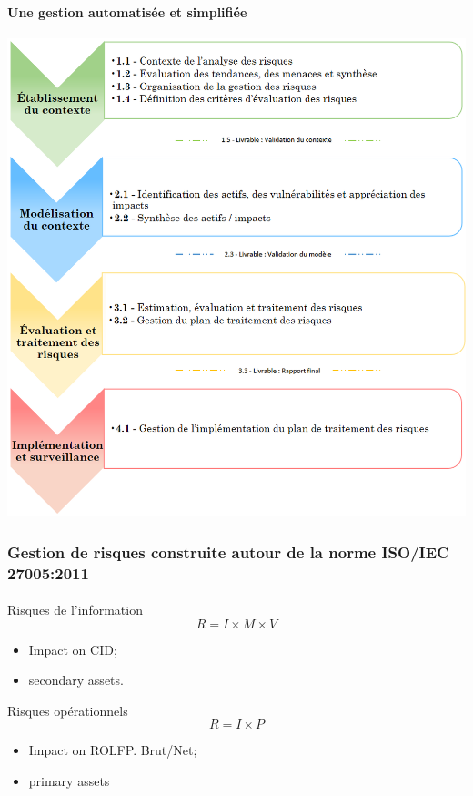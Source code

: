 \documentclass[]{beamer}
\begin{document}
\begin{frame}
    \frametitle{}
    \framesubtitle{Une gestion automatisée et simplifiée}
    \begin{center}
        \includegraphics[scale=0.5]{./images/MONARC-method-2.png}
    \end{center}
\end{frame}


\begin{frame}
    \frametitle{Gestion de risques construite autour de la norme ISO/IEC 27005:2011}
    \framesubtitle{}
    \begin{block}{Risques de l’information}
        $$R = I \times M \times V$$
        \begin{itemize}
            \item Impact on CID;
            \item secondary assets.
        \end{itemize}
    \end{block}


    \begin{block}{Risques opérationnels}
        $$R = I \times P$$
        \begin{itemize}
            \item Impact on ROLFP. Brut/Net;
            \item primary assets
        \end{itemize}
    \end{block}
\end{frame}
\end{document}
